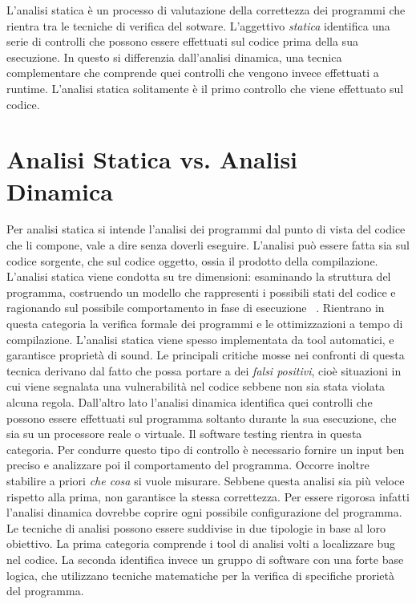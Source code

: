 L'analisi statica è un processo di valutazione della correttezza dei programmi che rientra tra le tecniche di verifica del sotware. L'aggettivo \textit{statica} identifica una serie di controlli che possono essere effettuati sul codice prima della sua esecuzione. In questo si differenzia dall'analisi dinamica, una tecnica complementare che comprende quei controlli che vengono invece effettuati a runtime.\newline
\indent L'analisi statica solitamente è il primo controllo che viene effettuato sul codice.


\section{Analisi Statica vs. Analisi Dinamica}

Per analisi statica si intende l'analisi dei programmi dal punto di vista del codice che li compone, vale a dire senza doverli eseguire. L'analisi può essere fatta sia sul codice sorgente, che sul codice oggetto, ossia  il prodotto della compilazione.\newline
\indent L'analisi statica viene condotta su tre dimensioni: esaminando la struttura del programma, costruendo un modello che rappresenti i possibili stati del codice e ragionando sul possibile comportamento in fase di esecuzione ~\cite{ernst-ijcai97}. 
Rientrano in questa categoria la verifica formale dei programmi e le ottimizzazioni a tempo di compilazione. L'analisi statica viene spesso implementata da tool automatici, e garantisce proprietà di sound. Le principali critiche mosse nei confronti di questa tecnica derivano dal fatto che possa portare a dei \textit{falsi positivi}, cioè situazioni in cui viene segnalata una vulnerabilità nel codice sebbene non sia stata violata alcuna regola.\newline
\indent Dall'altro lato l'analisi dinamica identifica quei controlli che possono essere effettuati sul programma soltanto durante la sua esecuzione, che sia su un processore reale o virtuale. Il software testing rientra in questa categoria. Per condurre questo tipo di controllo è necessario fornire un input ben preciso e analizzare poi il comportamento del programma. Occorre inoltre stabilire a priori \emph{che cosa} si vuole misurare. Sebbene questa analisi sia più veloce rispetto alla prima, non garantisce la stessa correttezza. Per essere rigorosa infatti l'analisi dinamica dovrebbe coprire ogni possibile configurazione del programma.\\
\newline
\indent Le tecniche di analisi possono essere suddivise in due tipologie in base al loro obiettivo. La prima categoria comprende i tool di analisi volti a localizzare bug nel codice. La seconda identifica invece un gruppo di software con una forte base logica, che utilizzano tecniche matematiche per la verifica di specifiche prorietà del programma.\newline


